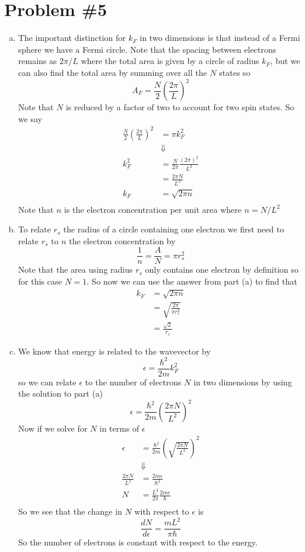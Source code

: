 \documentclass[11pt]{article}
\numberwithin{equation}{section}
\begin{document}
\section{Problem \#5}
\begin{enumerate}[(a)]
\item
The important distinction for $k_F$ in two dimensions is that instead of a Fermi sphere we have a Fermi circle. Note that the spacing between electrons remains as $2\pi/L$ where the total area is given by a circle of radius $k_F$, but we can also find the total area by summing over all the $N$ states so
$$A_F = \frac{N}{2}\left(\frac{2\pi}{L}\right)^2$$
Note that $N$ is reduced by a factor of two to account for two spin states. So we say
\begin{align*}
\frac{N}{2}\left(\frac{2\pi}{L}\right)^2 &= \pi k_F^2\\
&\Downarrow\\
k_F^2 &= \frac{N}{2\pi}\frac{(2\pi)^2}{L^2}\\
&= \frac{2\pi N}{L^2}\\
k_F &= \sqrt{2\pi n}\\
\end{align*}
Note that $n$ is the electron concentration per unit area where $n=N/L^2$ 

\item
To relate $r_s$ the radius of a circle containing one electron we first need to relate $r_s$ to $n$ the electron concentration by
$$\frac{1}{n} = \frac{A}{N}= \pi r_s^2$$
Note that the area using radius $r_s$ only contains one electron by definition so for this case $N=1$. So now we can use the answer from part (a) to find that
\begin{align*}
k_F &= \sqrt{2\pi n}\\
&= \sqrt{\frac{2\pi}{\pi r_s^2}}\\ 
&= \frac{\sqrt{2}}{r_s} 
\end{align*}

\item
We know that energy is related to the wavevector by
$$\epsilon = \frac{\hbar^2}{2m}k_F^2$$
so we can relate $\epsilon$ to the number of electrons $N$ in two dimensions by using the solution to part (a) 
$$\epsilon = \frac{\hbar^2}{2m}\left(\frac{2\pi N}{L^2}\right)^2$$
Now if we solve for $N$ in terms of $\epsilon$
\begin{align*}
\epsilon &= \frac{\hbar^2}{2m}\left(\sqrt{\frac{2\pi N}{L^2}}\right)^2\\
&\Downarrow\\
 \frac{2\pi N}{L^2} &= \frac{2m\epsilon}{\hbar^2}\\
N &=\frac{L^2}{2\pi}\frac{2m\epsilon}{\hbar}\\
\end{align*}
So we see that the change in $N$ with respect to $\epsilon$ is 
$$\frac{dN}{d\epsilon} = \frac{mL^2}{\pi\hbar}$$
So the number of electrons is constant with respect to the energy.

\end{enumerate}
\end{document}
